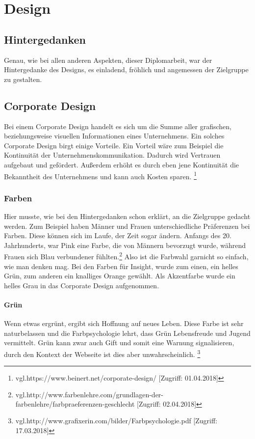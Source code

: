 \chapter{Design}
\renewcommand{\kapitelautor}{Autor: Niklas Kienreich}

\section{Hintergedanken}
Genau, wie bei allen anderen Aspekten, dieser Diplomarbeit, war der Hintergedanke des Designs, es einladend, fröhlich und angemessen der Zielgruppe zu gestalten.

\section{Corporate Design}
Bei einem Corporate Design handelt es sich um die Summe aller grafischen, beziehungsweise visuellen Informationen eines Unternehmens. Ein solches Corporate Design birgt einige Vorteile.
Ein Vorteil wäre zum Beispiel die Kontinuität der Unternehmenskommunikation. Dadurch wird Vertrauen aufgebaut und gefördert. Außerdem erhöht es durch eben jene Kontinuität die Bekanntheit des Unternehmens und kann auch Kosten sparen. \footnote{\label{} vgl.https://www.beinert.net/corporate-design/ [Zugriff: 01.04.2018]}
\subsection{Farben}
Hier musste, wie bei den Hintergedanken schon erklärt, an die Zielgruppe gedacht werden. Zum Beispiel haben Männer und Frauen unterschiedliche Präferenzen bei Farben. Diese können sich im Laufe, der Zeit sogar ändern. Anfangs des 20. Jahrhunderts, war Pink eine Farbe, die von Männern bevorzugt wurde, während Frauen sich Blau verbundener fühlten.\footnote{\label{} vgl.http://www.farbenlehre.com/grundlagen-der-farbenlehre/farbpraeferenzen-geschlecht [Zugriff: 02.04.2018]} Also ist die Farbwahl garnicht so einfach, wie man denken mag. Bei den Farben für Insight, wurde zum einen, ein helles Grün, zum anderen ein knalliges Orange gewählt. Als Akzentfarbe wurde ein helles Grau in das Corporate Design aufgenommen.

\subsubsection{Grün}
Wenn etwas ergrünt, ergibt sich Hoffnung auf neues Leben. Diese Farbe ist sehr naturbelassen und die Farbpsychologie lehrt, dass Grün Lebensfreude und Jugend vermittelt. Grün kann zwar auch Gift und somit eine Warnung signalisieren, durch den Kontext der Webseite ist dies aber unwahrscheinlich. \footnote{\label{} vgl.http://www.grafixerin.com/bilder/Farbpsychologie.pdf [Zugriff: 17.03.2018]}

